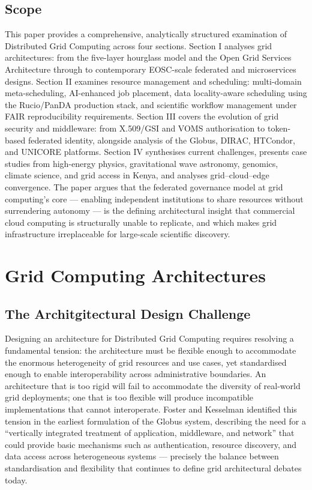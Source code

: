 \documentclass[12pt,a4paper]{report}
\begin{document}
\subsection*{Scope}
This paper provides a comprehensive, analytically structured examination of Distributed Grid Computing across four sections. Section I analyses grid 
architectures: from the five-layer hourglass model \parencite{foster2001} and the Open Grid Services Architecture through to contemporary EOSC-scale 
federated and microservices designs. Section II examines resource management and scheduling: multi-domain meta-scheduling, AI-enhanced job placement, 
data locality-aware scheduling using the Rucio/PanDA production stack, and scientific workflow management under FAIR reproducibility requirements. 
Section III covers the evolution of grid security and middleware: from X.509/GSI and VOMS authorisation to token-based federated identity, alongside
 analysis of the Globus, DIRAC, HTCondor, and UNICORE platforms. Section IV synthesises current challenges, presents case studies from high-energy physics,
  gravitational wave astronomy, genomics, climate science, and grid access in Kenya, and analyses grid–cloud–edge convergence. The paper argues that 
  the federated governance model at grid computing’s core — enabling independent institutions to share resources without surrendering autonomy — is 
  the defining architectural insight that commercial cloud computing is structurally unable to replicate, and which makes grid infrastructure irreplaceable
   for large-scale scientific discovery.

\section*{Grid Computing Architectures}
\subsection*{The Architgitectural Design Challenge}
Designing an architecture for Distributed Grid Computing requires resolving a fundamental tension: 
the architecture must be flexible enough to accommodate the enormous heterogeneity of grid resources 
and use cases, yet standardised enough to enable interoperability across administrative boundaries. 
An architecture that is too rigid will fail to accommodate the diversity of real-world grid deployments; 
one that is too flexible will produce incompatible implementations that cannot interoperate. Foster and
 Kesselman \parencite{foster1997} identified this tension in the earliest formulation of the Globus system, describing 
 the need for a “vertically integrated treatment of application, middleware, and network” that could
  provide basic mechanisms such as authentication, resource discovery, and data access across heterogeneous 
  systems — precisely the balance between standardisation and flexibility that continues to define grid architectural debates today.
\end{document}
